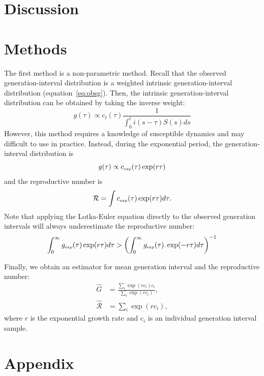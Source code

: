 \documentclass[12pt]{article}
\newcommand{\RR}{\ensuremath{{\mathcal R}}}
\newcommand{\tsub}[2]{#1_{{\textrm{\tiny #2}}}}
\begin{document}
\clearpage

\section{Discussion}

\section{Methods}

The first method is a non-parametric method.
Recall that the observed generation-interval distribution is a weighted intrinsic generation-interval distribution (equation~\ref{eq:obsg}). 
Then, the intrinsic generation-interval distribution can be obtained by taking the inverse weight:
\begin{equation}
g(\tau) \propto c_t(\tau) \frac{1}{\int_{0}^t i(s-\tau) S(s) ds}
\end{equation}
However, this method requires a knowledge of susceptible dynamics and may difficult to use in practice.
Instead, during the exponential period, the generation-interval distribution is
\begin{equation}
g(\tau) \propto \tsub{c}{exp}(\tau) \exp(r\tau)
\end{equation}
and the reproductive number is
\begin{equation}
\RR = \int \tsub{c}{exp}(\tau) \exp(r\tau) d\tau.
\end{equation}
Note that applying the Lotka-Euler equation directly to the observed generation intervals will always underestimate the reproductive number:
\begin{equation}
\int_0^\infty \tsub{g}{exp}(\tau) \exp(r\tau) d\tau > \left(\int_0^\infty \tsub{g}{exp}(\tau). \exp(-r\tau) d\tau\right)^{-1}
\end{equation}

Finally, we obtain an estimator for mean generation interval and the reproductive number:
\begin{equation}
\begin{aligned}
\hat{G} &= \frac{\sum_{i} \exp(r c_i) c_i}{\sum_{i} \exp(r c_i)},\\
\hat{\RR} &= \sum_{i} \exp(r c_i),
\end{aligned}
\end{equation}
where $r$ is the exponential growth rate and $c_i$ is an individual generation interval sample.

\section{Appendix}
\end{document}
